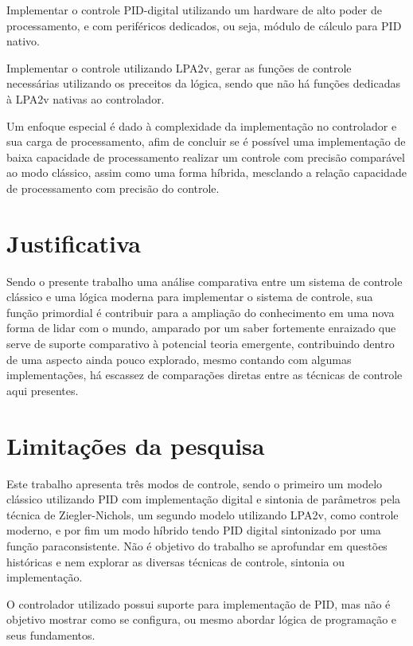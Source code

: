 \documentclass[12pt,a4paper]{report}
\begin{document}
Implementar o controle PID-digital utilizando um hardware de alto poder de processamento, e com periféricos dedicados, ou seja, módulo de cálculo para PID nativo. 

Implementar o controle utilizando LPA2v, gerar as funções de controle necessárias utilizando os preceitos da lógica, sendo que não há funções dedicadas à LPA2v nativas ao controlador.

Um enfoque especial é dado à complexidade da implementação no controlador e sua carga de processamento, afim de concluir se é possível uma implementação de baixa capacidade de processamento realizar um controle com precisão comparável ao modo clássico, assim como uma forma híbrida, mesclando a relação capacidade de processamento com precisão do controle. 


\section{Justificativa}
Sendo o presente trabalho uma análise comparativa entre um sistema de controle clássico e uma lógica moderna para implementar o sistema de controle, sua função primordial é contribuir para a ampliação do conhecimento em uma nova forma de lidar com o mundo, amparado por um saber fortemente enraizado que serve de suporte comparativo à potencial teoria emergente, contribuindo dentro de uma aspecto ainda pouco explorado, mesmo contando com algumas implementações, há escassez de comparações diretas entre as técnicas de controle aqui presentes.

\section{Limitações da pesquisa}

Este trabalho apresenta três modos de controle, sendo o primeiro um modelo clássico utilizando PID com implementação digital e sintonia de parâmetros pela técnica de Ziegler-Nichols, um segundo modelo utilizando LPA2v, como controle moderno, e por fim um modo híbrido tendo PID digital sintonizado por uma função paraconsistente. Não é objetivo do trabalho se aprofundar em questões históricas e nem explorar as diversas técnicas de controle, sintonia ou implementação.

O controlador utilizado possui suporte para implementação de PID, mas não é objetivo mostrar como se configura, ou mesmo abordar lógica de programação e seus fundamentos.
\end{document}
